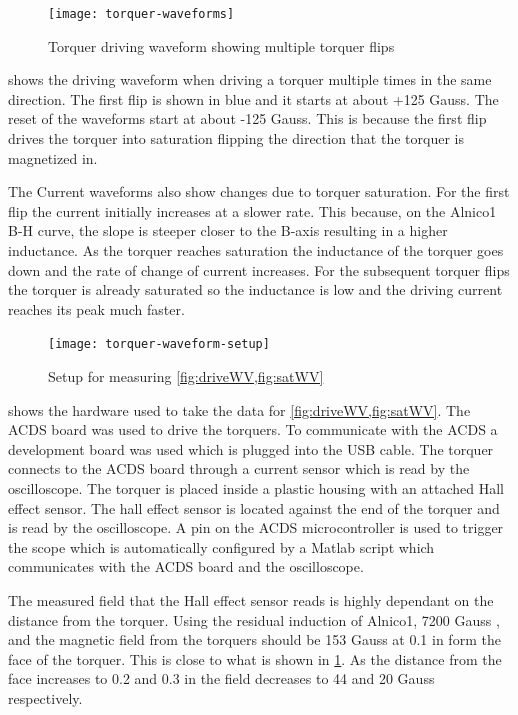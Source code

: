 \begin{figure}[H]
    \centering
    \texttt{[image: torquer-waveforms]}
    \caption{Torquer driving waveform showing multiple torquer flips}
    \label{fig:driveWV}
\end{figure}

 shows the driving waveform when driving a torquer multiple times in the same direction. The first flip is shown in blue and it starts at about +125 Gauss. The reset of the waveforms start at about -125 Gauss. This is because the first flip drives the torquer into saturation flipping the direction that the torquer is magnetized in.

The Current waveforms also show changes due to torquer saturation. For the first flip the current initially increases at a slower rate. This because, on the Alnico1 B-H curve, the slope is steeper closer to the B-axis resulting in a higher inductance. As the torquer reaches saturation the inductance of the torquer goes down and the rate of change of current increases. For the subsequent torquer flips the torquer is already saturated so the inductance is low and the driving current reaches its peak much faster.

\begin{figure}[H]
    \centering
    \texttt{[image: torquer-waveform-setup]}
    \caption{Setup for measuring \cref{fig:driveWV,fig:satWV}}
    \label{fig:WVsetup}
\end{figure}

 shows the hardware used to take the data for \cref{fig:driveWV,fig:satWV}. The \ac{ACDS} board was used to drive the torquers. To communicate with the \ac{ACDS} a development board was used which is plugged into the \ac{USB} cable. The torquer connects to the \ac{ACDS} board through a current sensor which is read by the oscilloscope. The torquer is placed inside a plastic housing with an attached Hall effect sensor. The hall effect sensor is located against the end of the torquer and is read by the oscilloscope. A pin on the \ac{ACDS} microcontroller is  used to trigger the scope which is automatically configured by a Matlab script which communicates with the \ac{ACDS} board and the oscilloscope.

The measured field that the Hall effect sensor reads is highly dependant on the distance from the torquer. Using the residual induction of Alnico1, 7200 Gauss \cite{AlnicoProp}, and \cite{DexterField} the magnetic field from the torquers should be 153 Gauss at 0.1 in form the face of the torquer. This is close to what is shown in \cref{fig:driveWV}. As the distance from the face increases to 0.2 and 0.3 in the field decreases to 44 and 20 Gauss respectively.

